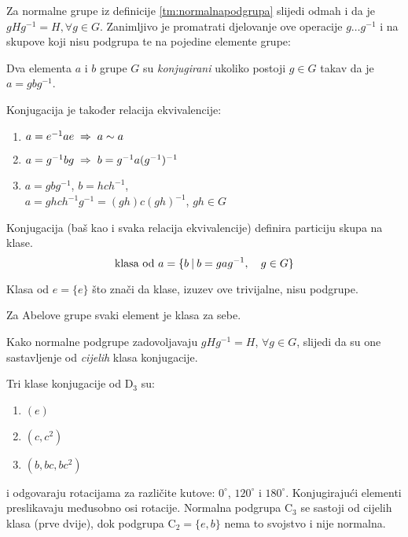 Za normalne grupe iz definicije \ref{tm:normalnapodgrupa} slijedi odmah i
da je $g H g^{-1} = H, \forall g\in G$. Zanimljivo je promatrati djelovanje
ove operacije $g \ldots g^{-1}$ i na skupove koji nisu podgrupa te
na pojedine elemente grupe:

\begin{definicija}
Dva elementa $a$ i $b$ grupe $G$ su \emph{konjugirani} ukoliko
postoji $g\in G$ takav da je $a=gbg^{-1}$.
\label{tm:konjugacija}
\end{definicija}

Konjugacija je također relacija ekvivalencije:
\begin{enumerate}
\item $a=e^{-1} a e  \;\Rightarrow\; a\sim a$
\item $a=g^{-1} b g  \;\Rightarrow\;  b= g^{-1} a (g^{-1})^{-1}$
\item $a=g b g^{-1}$, $b=hch^{-1}$, \\
         $a=ghch^{-1}g^{-1}=(gh)c(gh)^{-1}$, $gh\in G$
  
\end{enumerate}


Konjugacija (baš kao i svaka relacija ekvivalencije) definira
particiju skupa na klase.
\begin{displaymath}
   \text{klasa od $a$} = \{ b \: | \: b=gag^{-1},\quad g\in G\}
\end{displaymath}

Klasa od $e=\{e\}$ što znači da klase, izuzev ove trivijalne, nisu podgrupe.

Za Abelove grupe svaki element je klasa za sebe.

Kako normalne podgrupe zadovoljavaju $gHg^{-1}=H$, $\forall g\in G$, slijedi
da su one sastavljenje od \emph{cijelih} klasa konjugacije.

\begin{primjer} \label{pr:klaseD3}
Tri klase konjugacije  od D$_3$ su:
\begin{enumerate}
\item $(e)$
\item $(c, c^{2})$
\item $(b, bc, bc^2)$
\end{enumerate}
i odgovaraju rotacijama za različite kutove: $0^\circ$, $120^\circ$ i
$180^\circ$. Konjugirajući elementi
preslikavaju međusobno osi rotacije. Normalna podgrupa $\mathrm{C}_3$ se
sastoji od cijelih klasa (prve dvije), dok podgrupa $\mathrm{C}_2=\{e,b\}$ nema
to svojstvo i nije normalna.
\end{primjer}

